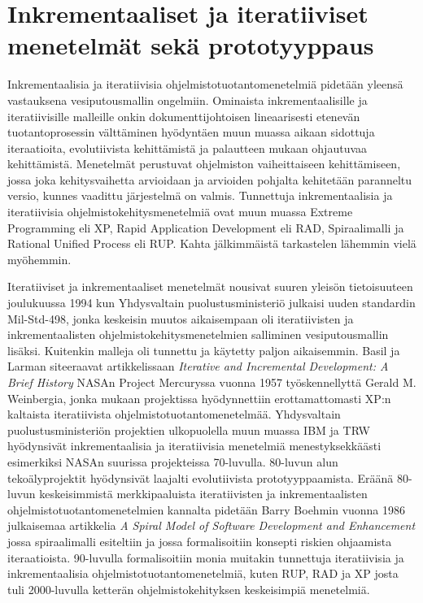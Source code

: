 \documentclass[finnish,12pt]{tktltiki2}
\theoremstyle{definition}
\theoremstyle{remark}
\begin{document}
\section{Inkrementaaliset ja iteratiiviset menetelmät sekä prototyyppaus}

Inkrementaalisia ja iteratiivisia ohjelmistotuotantomenetelmiä pidetään yleensä vastauksena vesiputousmallin ongelmiin. Ominaista inkrementaalisille ja iteratiivisille malleille onkin dokumenttijohtoisen lineaarisesti etenevän tuotantoprosessin välttäminen hyödyntäen muun muassa aikaan sidottuja iteraatioita, evolutiivista kehittämistä ja palautteen mukaan ohjautuvaa kehittämistä. \cite{larman03} Menetelmät perustuvat ohjelmiston vaiheittaiseen kehittämiseen, jossa joka kehitysvaihetta arvioidaan ja arvioiden pohjalta kehitetään paranneltu versio, kunnes vaadittu järjestelmä on valmis. \cite{Sommerville10}
Tunnettuja inkrementaalisia ja iteratiivisia ohjelmistokehitysmenetelmiä ovat muun muassa Extreme Programming eli XP, Rapid Application Development eli RAD, Spiraalimalli ja Rational Unified Process eli RUP. Kahta jälkimmäistä tarkastelen lähemmin vielä myöhemmin.

Iteratiiviset ja inkrementaaliset menetelmät nousivat suuren yleisön tietoisuuteen joulukuussa 1994 kun Yhdysvaltain puolustusministeriö julkaisi uuden standardin Mil-Std-498, jonka keskeisin muutos aikaisempaan oli iteratiivisten ja inkrementaalisten ohjelmistokehitysmenetelmien salliminen vesiputousmallin lisäksi. Kuitenkin malleja oli tunnettu ja käytetty paljon aikaisemmin. Basil ja Larman siteeraavat artikkelissaan \textit{Iterative and Incremental Development: A Brief History} \cite{larman03} NASAn Project Mercuryssa vuonna 1957 työskennellyttä Gerald M. Weinbergia, jonka mukaan projektissa hyödynnettiin erottamattomasti XP:n kaltaista iteratiivista ohjelmistotuotantomenetelmää. Yhdysvaltain puolustusministeriön projektien ulkopuolella muun muassa IBM ja TRW hyödynsivät inkrementaalisia ja iteratiivisia menetelmiä menestyksekkäästi esimerkiksi NASAn suurissa projekteissa 70-luvulla.\cite{larman03} 80-luvun alun tekoälyprojektit hyödynsivät laajalti evolutiivista prototyyppaamista. Eräänä 80-luvun keskeisimmistä merkkipaaluista iteratiivisten ja inkrementaalisten ohjelmistotuotantomenetelmien kannalta pidetään Barry Boehmin vuonna 1986 julkaisemaa artikkelia \textit{A Spiral Model of Software Development and Enhancement} \cite{Boehm:1988:SMS:45797.45801} jossa spiraalimalli esiteltiin ja jossa formalisoitiin konsepti riskien ohjaamista iteraatioista. 
90-luvulla formalisoitiin monia muitakin tunnettuja iteratiivisia ja inkrementaalisia ohjelmistotuotantomenetelmiä, kuten RUP, RAD ja XP \cite{larman03} josta tuli 2000-luvulla ketterän ohjelmistokehityksen keskeisimpiä menetelmiä.
\end{document}
